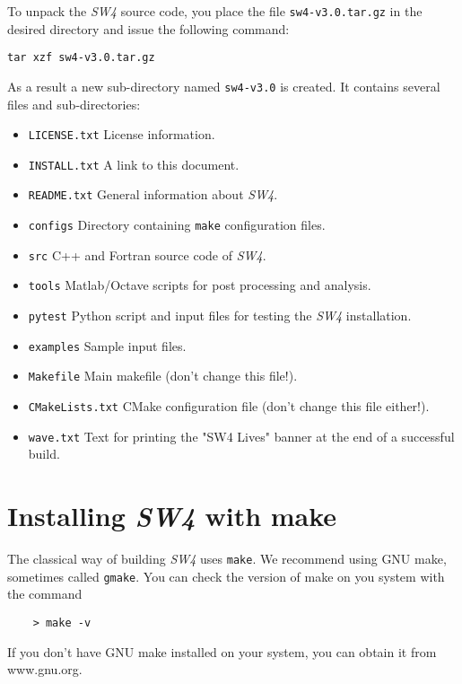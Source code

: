 \documentclass[11pt]{article}
\begin{document}
To unpack the \emph{SW4} source code, you place the file \verb+sw4-v3.0.tar.gz+ in the
desired directory and issue the following command:
\begin{verbatim}
tar xzf sw4-v3.0.tar.gz
\end{verbatim}
As a result a new sub-directory named \verb+sw4-v3.0+ is created. It contains several files
and sub-directories:
%
\begin{itemize}
\item \verb+LICENSE.txt+ License information.
\item \verb+INSTALL.txt+ A link to this document.
\item \verb+README.txt+ General information about \emph{SW4}.
\item \verb+configs+ Directory containing \verb+make+ configuration files.
\item \verb+src+ C++ and Fortran source code of \emph{SW4}.
\item \verb+tools+ Matlab/Octave scripts for post processing and analysis.
\item \verb+pytest+ Python script and input files for testing the \emph{SW4} installation.
\item \verb+examples+ Sample input files.
\item \verb+Makefile+ Main makefile (don't change this file!).
\item \verb+CMakeLists.txt+ CMake configuration file (don't change this file either!).
\item \verb+wave.txt+ Text for printing the "SW4 Lives" banner at the end of a successful build.
\end{itemize}

\section{Installing \emph{SW4} with make}\label{cha:installing-sw4}


The classical way of building \emph{SW4} uses \verb+make+. We recommend using GNU make, sometimes called \verb+gmake+. You can check the version of make on you system with the command
\begin{verbatim}
    > make -v
\end{verbatim}
If you don't have GNU make installed on your system, you can obtain it from www.gnu.org.
\end{document}
